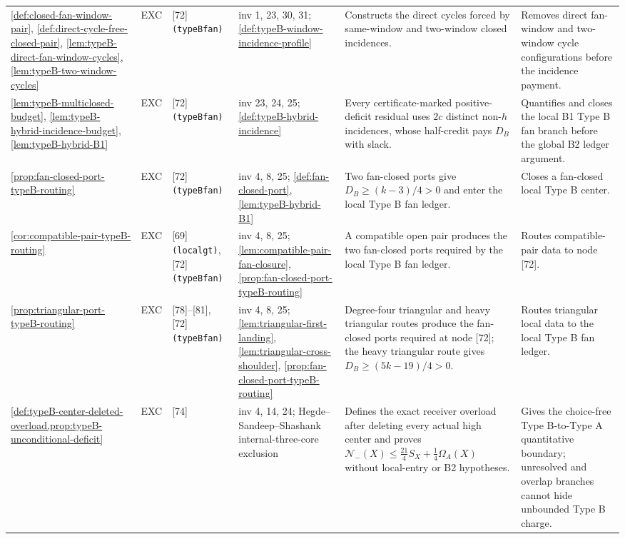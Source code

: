 \documentclass[11pt]{article}
\newcommand{\No}{\mathcal N}
\begin{document}
{\begin{longtable}{L{0.10\textwidth} C{0.045\textwidth} L{0.13\textwidth} L{0.135\textwidth} L{0.28\textwidth} L{0.20\textwidth}}
\cref{def:closed-fan-window-pair}, \cref{def:direct-cycle-free-closed-pair}, \cref{lem:typeB-direct-fan-window-cycles}, \cref{lem:typeB-two-window-cycles} & EXC & [72] \texttt{(typeBfan)} & inv 1, 23, 30, 31; \cref{def:typeB-window-incidence-profile} & Constructs the direct cycles forced by same-window and two-window closed incidences. & Removes direct fan-window and two-window cycle configurations before the incidence payment. \\
\cref{lem:typeB-multiclosed-budget}, \cref{lem:typeB-hybrid-incidence-budget}, \cref{lem:typeB-hybrid-B1} & EXC & [72] \texttt{(typeBfan)} & inv 23, 24, 25; \cref{def:typeB-hybrid-incidence} & Every certificate-marked positive-deficit residual uses \(2c\) distinct non-\(h\) incidences, whose half-credit pays \(D_B\) with slack. & Quantifies and closes the local B1 Type B fan branch before the global B2 ledger argument. \\
\cref{prop:fan-closed-port-typeB-routing} & EXC & [72] \texttt{(typeBfan)} & inv 4, 8, 25; \cref{def:fan-closed-port}, \cref{lem:typeB-hybrid-B1} & Two fan-closed ports give \(D_B\ge(k-3)/4>0\) and enter the local Type B fan ledger. & Closes a fan-closed local Type B center. \\
\cref{cor:compatible-pair-typeB-routing} & EXC & [69] \texttt{(localgt)}, [72] \texttt{(typeBfan)} & inv 4, 8, 25; \cref{lem:compatible-pair-fan-closure}, \cref{prop:fan-closed-port-typeB-routing} & A compatible open pair produces the two fan-closed ports required by the local Type B fan ledger. & Routes compatible-pair data to node [72]. \\
\cref{prop:triangular-port-typeB-routing} & EXC & [78]--[81], [72] \texttt{(typeBfan)} & inv 4, 8, 25; \cref{lem:triangular-first-landing}, \cref{lem:triangular-cross-shoulder}, \cref{prop:fan-closed-port-typeB-routing} & Degree-four triangular and heavy triangular routes produce the fan-closed ports required at node [72]; the heavy triangular route gives \(D_B\ge(5k-19)/4>0\). & Routes triangular local data to the local Type B fan ledger. \\
\cref{def:typeB-center-deleted-overload,prop:typeB-unconditional-deficit} & EXC & [74] & inv 4, 14, 24; Hegde--Sandeep--Shashank internal-three-core exclusion & Defines the exact receiver overload after deleting every actual high center and proves \(\No_-(X)\le\frac{21}{4}S_X+\frac14\Omega_A(X)\) without local-entry or B2 hypotheses. & Gives the choice-free Type B-to-Type A quantitative boundary; unresolved and overlap branches cannot hide unbounded Type B charge. \\

\end{longtable}}
\end{document}
